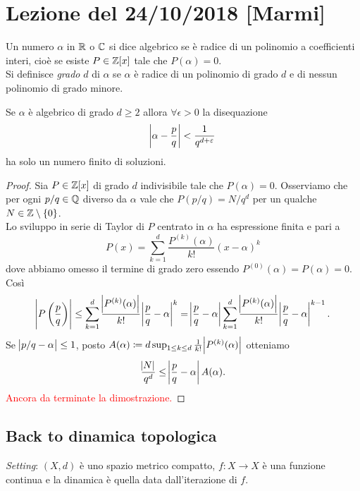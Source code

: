 \section{Lezione del 24/10/2018 [Marmi]}

\begin{definition}
	Un numero $ \alpha $ in $ \mathbb{R} $ o $ \mathbb{C} $ si dice algebrico se è radice di un polinomio a coefficienti interi, cioè se esiste $ P \in \mathbb{Z}[x] $ tale che $ P(\alpha) = 0 $. \\
	Si definisce \emph{grado} $ d $ di $ \alpha $ se $ \alpha $ è radice di un polinomio di grado $ d $ e di nessun polinomio di grado minore.  
\end{definition}

\begin{thm}[Liouville]
	Se $ \alpha $ è algebrico di grado $ d \geq 2 $ allora $ \forall \epsilon > 0 $ la disequazione
	\[
		\abs{\alpha - \frac{p}{q}} < \frac{1}{q^{d + \varepsilon}}
	\]
	ha solo un numero finito di soluzioni. 
\end{thm}
%
\begin{proof}
	Sia $ P \in \mathbb{Z}[x] $ di grado $ d $ indivisibile tale che $ P(\alpha) = 0 $. Osserviamo che per ogni $ p/q \in \mathbb{Q} $ diverso da $ \alpha $ vale che $ P(p/q) = N/q^d $ per un qualche $ N \in \mathbb{Z} \setminus \{0\} $. \\
	Lo sviluppo in serie di Taylor di $ P $ centrato in $ \alpha $ ha espressione finita e pari a 
	\[
		P(x) = \sum_{k = 1}^{d} \frac{P^{(k)}(\alpha)}{k!} (x - \alpha)^k
	\]
	dove abbiamo omesso il termine di grado zero essendo $ P^{(0)}(\alpha) = P(\alpha) = 0 $. Così
	\[
		\abs{P\left(\frac{p}{q}\right)} \leq \sum_{k = 1}^{d} \frac{\abs{P^{(k)}(\alpha)}}{k!} \abs{\frac{p}{q} - \alpha}^k = \abs{\frac{p}{q} - \alpha} \sum_{k = 1}^{d} \frac{\abs{P^{(k)}(\alpha)}}{k!} \abs{\frac{p}{q} - \alpha}^{k - 1}.
	\]
	Se $ \abs{p/q - \alpha} \leq 1 $, posto $ A(\alpha) \coloneqq d \sup_{1 \leq k \leq d} \frac{1}{k!} \abs{P^{(k)}(\alpha)} $ otteniamo 
	\[
		\frac{\abs{N}}{q^d} \leq \abs{\frac{p}{q} - \alpha} A(\alpha).
	\]
	\textcolor{red}{Ancora da terminate la dimostrazione.}
\end{proof}

\subsection{Back to dinamica topologica}
\emph{Setting}: $ (X, d) $ è uno spazio metrico compatto, $ f \colon X \to X $ è una funzione continua e la dinamica è quella data dall'iterazione di $ f $. 


